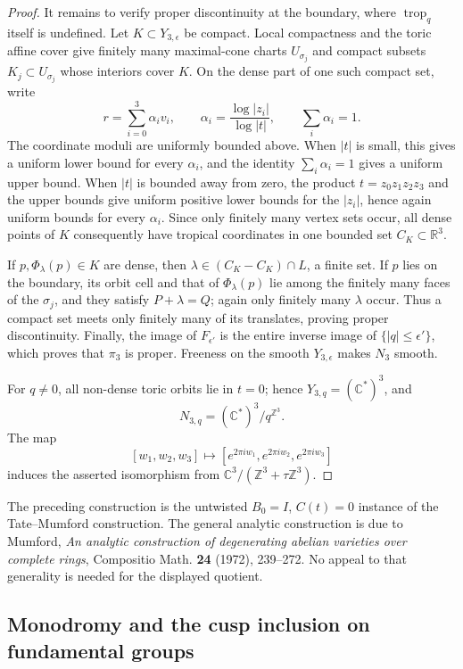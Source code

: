 \begin{proof}
It remains to verify proper discontinuity at the boundary, where
\(\operatorname{trop}_q\) itself is undefined.  Let \(K\subset
Y_{3,\epsilon}\) be compact.  Local compactness and the toric affine cover
give finitely many maximal-cone charts \(U_{\sigma_j}\) and compact subsets
\(K_j\subset U_{\sigma_j}\) whose interiors cover \(K\).  On the dense part
of one such compact set, write
\[
 r=\sum_{i=0}^3\alpha_iv_i,\qquad
 \alpha_i=\frac{\log|z_i|}{\log|t|},\qquad
 \sum_i\alpha_i=1.
\]
The coordinate moduli are uniformly bounded above.  When \(|t|\) is small,
this gives a uniform lower bound for every \(\alpha_i\), and the identity
\(\sum_i\alpha_i=1\) gives a uniform upper bound.  When \(|t|\) is bounded
away from zero, the product \(t=z_0z_1z_2z_3\) and the upper bounds give
uniform positive lower bounds for the \(|z_i|\), hence again uniform bounds
for every \(\alpha_i\).  Since only finitely many vertex sets occur, all
dense points of \(K\) consequently have tropical coordinates in one bounded
set \(C_K\subset\mathbb R^3\).

If \(p,\Phi_\lambda(p)\in K\) are dense, then
\(\lambda\in(C_K-C_K)\cap L\), a finite set.  If \(p\) lies on the
boundary, its orbit cell and that of \(\Phi_\lambda(p)\) lie among the
finitely many faces of the \(\sigma_j\), and they satisfy
\(P+\lambda=Q\); again only finitely many \(\lambda\) occur.  Thus a compact
set meets only finitely many of its translates, proving proper
discontinuity.  Finally, the image of \(F_{\epsilon'}\) is the entire inverse
image of \(\{|q|\le\epsilon'\}\), which proves that \(\pi_3\) is proper.
Freeness on the smooth \(Y_{3,\epsilon}\) makes \(N_3\) smooth.

For \(q\ne0\), all non-dense toric orbits lie in \(t=0\); hence
\(Y_{3,q}=(\mathbb C^*)^3\), and
\[
 N_{3,q}=(\mathbb C^*)^3/q^{\mathbb Z^3}.
\]
The map
\[
 [w_1,w_2,w_3]\longmapsto
 [e^{2\pi i w_1},e^{2\pi i w_2},e^{2\pi i w_3}]
\]
induces the asserted isomorphism from
\(\mathbb C^3/(\mathbb Z^3+\tau\mathbb Z^3)\).
\end{proof}

The preceding construction is the untwisted
\(B_0=I\), \(C(t)=0\) instance of the Tate--Mumford construction.
The general analytic construction is due to Mumford,
\emph{An analytic construction of degenerating abelian varieties over
complete rings}, Compositio Math. \textbf{24} (1972), 239--272.
No appeal to that generality is needed for the displayed quotient.

\subsection{Monodromy and the cusp inclusion on fundamental groups}
\label{hrftd:monodromy}

